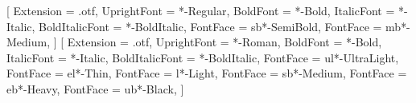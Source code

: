 \usepackage{url}

\usepackage{xr}
\usepackage{zref}

\makeatletter
\newcommand*{\addFileDependency}[1]{%
  \typeout{(#1)}
  \@addtofilelist{#1}
  \IfFileExists{#1}{}{\typeout{No file #1.}}
}
\makeatother

\newcommand*{\myexternaldocument}[1]{%
    \addFileDependency{#1.tex}%
    \addFileDependency{#1.aux}%
}

\usepackage{fontspec}
%
\setmainfont{STIX Two Text}[
    Extension = {.otf},
    UprightFont = {*-Regular},
    BoldFont = {*-Bold},
    ItalicFont = {*-Italic},
    BoldItalicFont = {*-BoldItalic},
    FontFace = {sb}{\shapedefault}{*-SemiBold},
    FontFace = {mb}{\shapedefault}{*-Medium},
]
%
\setsansfont{Helvetica Neue}[
    Extension = {.otf},
    UprightFont = {*-Roman},
    BoldFont = {*-Bold},
    ItalicFont = {*-Italic},
    BoldItalicFont = {*-BoldItalic},
    FontFace = {ul}{\shapedefault}{*-UltraLight},
    FontFace = {el}{\shapedefault}{*-Thin},
    FontFace = {l}{\shapedefault}{*-Light},
    FontFace = {sb}{\shapedefault}{*-Medium},
    FontFace = {eb}{\shapedefault}{*-Heavy},
    FontFace = {ub}{\shapedefault}{*-Black},
]
%
\DeclareRobustCommand{\ulseries}{\fontseries{ul}\selectfont}
\DeclareRobustCommand{\elseries}{\fontseries{el}\selectfont}
\DeclareRobustCommand{\lseries}{\fontseries{l}\selectfont}
\DeclareRobustCommand{\mbseries}{\fontseries{mb}\selectfont}
\DeclareRobustCommand{\sbseries}{\fontseries{sb}\selectfont}
\DeclareRobustCommand{\ebseries}{\fontseries{eb}\selectfont}
\DeclareRobustCommand{\ubseries}{\fontseries{ub}\selectfont}
%
\usepackage[math-style=TeX,bold-style=TeX]{unicode-math}
%
%
%

